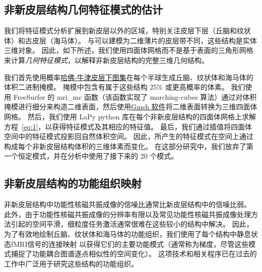 \documentclass[lang=cn,a4paper,newtx,citestyle=gb7714-2015, bibstyle=gb7714-2015]{elegantpaper}
\begin{document}
\subsection{非新皮层结构几何特征模式的估计} \label{sec:geometric_estimation}

我们将特征模式分析扩展到新皮层以外的区域，特别关注皮层下层（丘脑和纹状体）和古皮层（海马体）。
与可以建模为二维薄片的皮层带不同，这些结构是实体三维对象。 
因此，如下所述，我们使用四面体网格而不是基于表面的三角形网格来计算\textit{几何特征模式}，以解释非新皮层结构的完整三维几何结构\cite{wachinger2015brainprint}。


我们首先使用概率\href{https://fsl.fmrib.ox.ac.uk/fsl/fslwiki/Atlases}{哈佛-牛津皮层下图集}在每个半球生成丘脑、纹状体和海马体的体积二进制掩模。
掩模中包含有属于这些结构 25\% 或更高概率的体素。
我们使用 FreeSurfer 的 mri\_mc 函数（该函数实现了 marching-cubes 算法）通过对体积掩模进行细分来构造二维表面，然后使用\href{https://gmsh.info/}{Gmsh 软件}将二维表面转换为三维四面体网格。
然后，我们使用 LaPy python 库在每个非新皮层结构的四面体网格上求解方程~\ref{eq:1}，以获得特征模式及其相应的特征值。
最后，我们通过插值将四面体空间中的特征模式投影回自然体积空间。
因此，所产生的特征模式在空间上通过构成每个非新皮层结构体积的三维体素而变化。
在这部分研究中，我们放弃了第一个恒定模式，并在分析中使用了接下来的 20 个模式。


\subsection{非新皮层结构的功能组织映射} \label{sec:functional_mapping}

非新皮层结构中功能性核磁共振成像的信噪比通常比新皮层结构中的信噪比弱\cite{uugurbil2013pushing}。
此外，由于功能性核磁共振成像的分辨率有限以及常见功能性核磁共振成像处理方法引起的空间平滑，细粒度任务激活通常很难在这些较小的结构中解决。
因此，为了有效地绘制丘脑、纹状体和海马体的功能组织，我们使用了每个结构中静息状态fMRI信号的连接映射\cite{haak2018connectopic} 以获得它们的主要功能模式（通常称为梯度，尽管这些模式捕捉了功能耦合图谱逐点相似性的空间变化）。
这项技术和相关程序已在过去的工作中广泛用于研究这些结构的功能组织\cite{vos2018anatomical,yang2020thalamic,oldehinkel2022mapping}。
\end{document}
